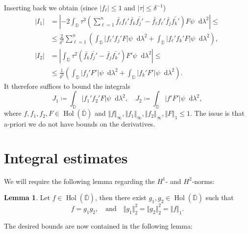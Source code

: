 \documentclass[letterpaper, 11pt]{article}
\newcommand{\D}{\mathbb{D}}
\newcommand{\1}{\mathds{1}}
\newcommand{\dd}{\mathop{}\!\mathrm{d}}
\newcommand{\cl}[1]{\overline{#1}}
\DeclareMathOperator*{\Hol}{Hol}
\theoremstyle{definition}
\newtheorem{lemma}[theorem]{Lemma}
\newenvironment{innerproof}
 {\renewcommand{\qedsymbol}{}\proof}
 {\endproof}
\begin{document}
\begin{innerproof}[Proof (continued)]
  Inserting back we obtain (since $\vert f_\ell \vert \leq 1$ and $\vert \tau \vert \leq \delta^{-1}$)
  \begin{align*}
    \vert I_1 \vert &= \left\vert -2 \int_\D \tau^3 \left( \sum_{\ell=1}^n \bar{f_\ell} f_\ell' \bar{f_k} \bar{f_j'} - \bar{f_\ell} f_\ell' \bar{f_j} \bar{f_k'} \right) F \psi \dd \lambda^2 \right\vert \leq \\
    &\leq \frac{2}{\delta^3} \sum_{\ell=1}^n \left( \int_\D \vert f_\ell' f_j' F \vert \psi \dd \lambda^2 + \int_\D \vert f_\ell' f_k' F \vert \psi \dd \lambda^2 \right), \\
    \vert I_2 \vert &= \left\vert \int_\D \tau^2 ( \bar{f_k} \bar{f_j'} - \bar{f_j} \bar{f_k'} ) F' \psi \dd \lambda^2 \right\vert \leq \\
    &\leq \frac{1}{\delta^2} \left( \int_\D \vert f_j' F' \vert \psi \dd \lambda^2 + \int_\D \vert f_k' F' \vert \psi \dd \lambda^2 \right).
  \end{align*}
  It therefore suffices to bound the integrals
  \begin{equation*}
    J_1 \coloneqq \int_\D \vert f_1' f_2' F \vert \psi \dd \lambda^2, \quad J_2 \coloneqq \int_\D \vert f' F' \vert \psi \dd \lambda^2,
  \end{equation*}
  where $f, f_1, f_2, F \in \Hol(\cl{\D})$ and $\Vert f \Vert_\infty, \Vert f_1 \Vert_\infty, \Vert f_2 \Vert_\infty, \Vert F \Vert_1 \leq 1$. The issue is that a-priori we do not have bounds on the derivatives.
\end{innerproof}

\section{Integral estimates}

We will require the following lemma regarding the $H^1$- and $H^2$-norms:

\begin{lemma} \label{lem:factorisation}
  Let $f \in \Hol(\cl{\D})$, then there exist $g_1, g_2 \in \Hol(\cl{\D})$ such that
  $$ f = g_1 g_2, \quad \textrm{and} \quad \Vert g_1 \Vert_2^2 = \Vert g_2 \Vert_2^2 = \Vert f \Vert_1. $$
\end{lemma}

The desired bounds are now contained in the following lemma:
\end{document}
